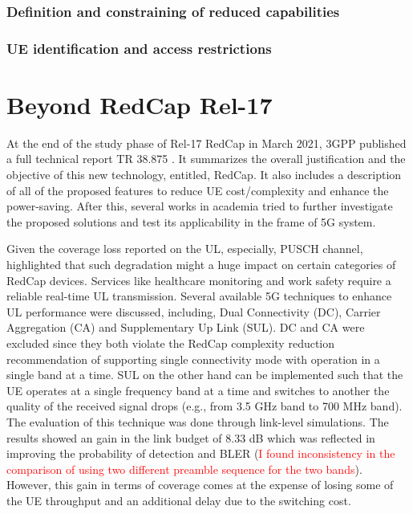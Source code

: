 \documentclass[conference]{IEEEtran}
\begin{document}
\subsubsection{Definition and constraining of reduced capabilities}
\subsubsection{UE identification and access restrictions}


\section{Beyond RedCap Rel-17}
\label{sec:7}



At the end of the study phase of Rel-17 RedCap in March 2021, 3GPP published a full technical report TR 38.875 \cite{3gpp.38.875}. It summarizes the overall justification and the objective of this new technology, entitled, RedCap. It also includes a description of all of the proposed features to reduce UE cost/complexity and enhance the power-saving. After this,  several works in academia tried to further investigate the proposed solutions and test its applicability in the frame of 5G system.

Given the coverage loss reported on the UL, especially, PUSCH channel, \cite{saafi_enhancing_2022} highlighted that such degradation might a huge impact on certain categories of RedCap devices. Services like healthcare monitoring and work safety require a reliable real-time UL transmission. Several available 5G techniques to enhance UL performance were discussed, including, Dual Connectivity (DC), Carrier Aggregation (CA) and Supplementary Up Link (SUL). DC and CA were excluded since they both violate the RedCap complexity reduction recommendation of supporting single connectivity mode with operation in a single band at a time. SUL on the other hand can be implemented such that the UE operates at a single frequency band at a time and switches to another the quality of the received signal drops (e.g., from 3.5 GHz band to 700 MHz band). The evaluation of this technique was done through link-level simulations. The results showed an gain in the link budget of 8.33 dB which was reflected in improving the probability of detection and BLER (\textcolor{red}{I found inconsistency in the comparison of using two different preamble sequence for the two bands}). However, this gain in terms of coverage comes at the expense of losing some of the UE throughput and an additional delay due to the switching cost.
\end{document}
